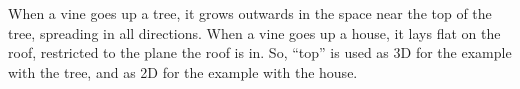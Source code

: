 When a vine goes up a tree,
it grows outwards in the space near the top of the tree,
spreading in all directions.
When a vine goes up a house,
it lays flat on the roof,
restricted to the plane the roof is in.
So, ``top'' is used as 3D for the example with the tree,
and as 2D for the example with the house.

